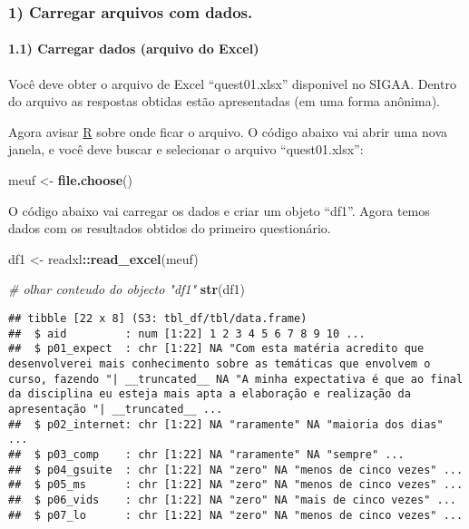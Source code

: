 \documentclass[
]{article}
\newenvironment{Shaded}{\begin{snugshade}}{\end{snugshade}}
\newcommand{\CommentTok}[1]{\textcolor[rgb]{0.56,0.35,0.01}{\textit{#1}}}
\newcommand{\KeywordTok}[1]{\textcolor[rgb]{0.13,0.29,0.53}{\textbf{#1}}}
\newcommand{\NormalTok}[1]{#1}
\newcommand{\OperatorTok}[1]{\textcolor[rgb]{0.81,0.36,0.00}{\textbf{#1}}}
\newcommand{\StringTok}[1]{\textcolor[rgb]{0.31,0.60,0.02}{#1}}
\begin{document}
\hypertarget{carregar-arquivos-com-dados.}{%
\subsubsection{1) Carregar arquivos com
dados.}\label{carregar-arquivos-com-dados.}}

\hypertarget{carregar-dados-arquivo-do-excel}{%
\paragraph{1.1) Carregar dados (arquivo do
Excel)}\label{carregar-dados-arquivo-do-excel}}

Você deve obter o arquivo de Excel ``quest01.xlsx'' disponivel no SIGAA.
Dentro do arquivo as respostas obtidas estão apresentadas (em uma forma
anônima).

Agora avisar \href{https://cran.r-project.org/}{R} sobre onde ficar o
arquivo. O código abaixo vai abrir uma nova janela, e você deve buscar e
selecionar o arquivo ``quest01.xlsx'':

\begin{Shaded}
\begin{Highlighting}[]
\NormalTok{meuf <-}\StringTok{ }\KeywordTok{file.choose}\NormalTok{()}
\end{Highlighting}
\end{Shaded}

O código abaixo vai carregar os dados e criar um objeto ``df1''. Agora
temos dados com os resultados obtidos do primeiro questionário.

\begin{Shaded}
\begin{Highlighting}[]
\NormalTok{df1 <-}\StringTok{ }\NormalTok{readxl}\OperatorTok{::}\KeywordTok{read_excel}\NormalTok{(meuf)}
\end{Highlighting}
\end{Shaded}

\begin{Shaded}
\begin{Highlighting}[]
\CommentTok{# olhar conteudo do objecto "df1"}
\KeywordTok{str}\NormalTok{(df1)}
\end{Highlighting}
\end{Shaded}

\begin{verbatim}
## tibble [22 x 8] (S3: tbl_df/tbl/data.frame)
##  $ aid         : num [1:22] 1 2 3 4 5 6 7 8 9 10 ...
##  $ p01_expect  : chr [1:22] NA "Com esta matéria acredito que desenvolverei mais conhecimento sobre as temáticas que envolvem o curso, fazendo "| __truncated__ NA "A minha expectativa é que ao final da disciplina eu esteja mais apta a elaboração e realização da apresentação "| __truncated__ ...
##  $ p02_internet: chr [1:22] NA "raramente" NA "maioria dos dias" ...
##  $ p03_comp    : chr [1:22] NA "raramente" NA "sempre" ...
##  $ p04_gsuite  : chr [1:22] NA "zero" NA "menos de cinco vezes" ...
##  $ p05_ms      : chr [1:22] NA "zero" NA "menos de cinco vezes" ...
##  $ p06_vids    : chr [1:22] NA "zero" NA "mais de cinco vezes" ...
##  $ p07_lo      : chr [1:22] NA "zero" NA "menos de cinco vezes" ...
\end{verbatim}
\end{document}
